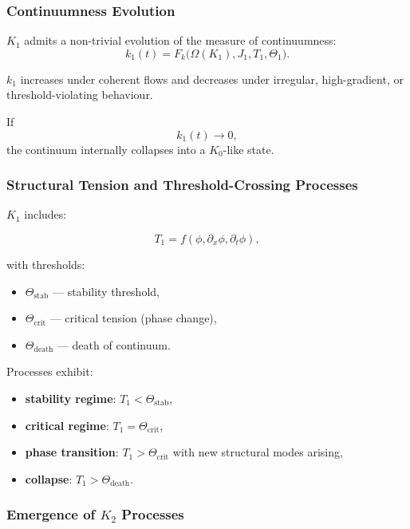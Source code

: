 \subsubsection{Continuumness Evolution}

$K_1$ admits a non-trivial evolution of the measure of continuumness:
\[
k_1(t) = F_k\big(\Omega(K_1), J_1, T_1, \Theta_1 \big).
\]

$k_1$ increases under coherent flows and decreases under irregular,
high-gradient, or threshold-violating behaviour.

If
\[
k_1(t) \to 0,
\]
the continuum internally collapses into a $K_0$-like state.

\subsubsection{Structural Tension and Threshold-Crossing Processes}

$K_1$ includes:

\[
T_1 = f(\phi, \partial_x \phi, \partial_t \phi),
\]

with thresholds:

\begin{itemize}
    \item $\Theta_{\mathrm{stab}}$ — stability threshold,
    \item $\Theta_{\mathrm{crit}}$ — critical tension (phase change),
    \item $\Theta_{\mathrm{death}}$ — death of continuum.
\end{itemize}

Processes exhibit:

\begin{itemize}
    \item \textbf{stability regime}: $T_1 < \Theta_{\mathrm{stab}}$,
    \item \textbf{critical regime}: $T_1 = \Theta_{\mathrm{crit}}$,
    \item \textbf{phase transition}: $T_1 > \Theta_{\mathrm{crit}}$ with new
          structural modes arising,
    \item \textbf{collapse}: $T_1 > \Theta_{\mathrm{death}}$.
\end{itemize}

\subsubsection{Emergence of \texorpdfstring{$K_2$}{K_2} Processes}

